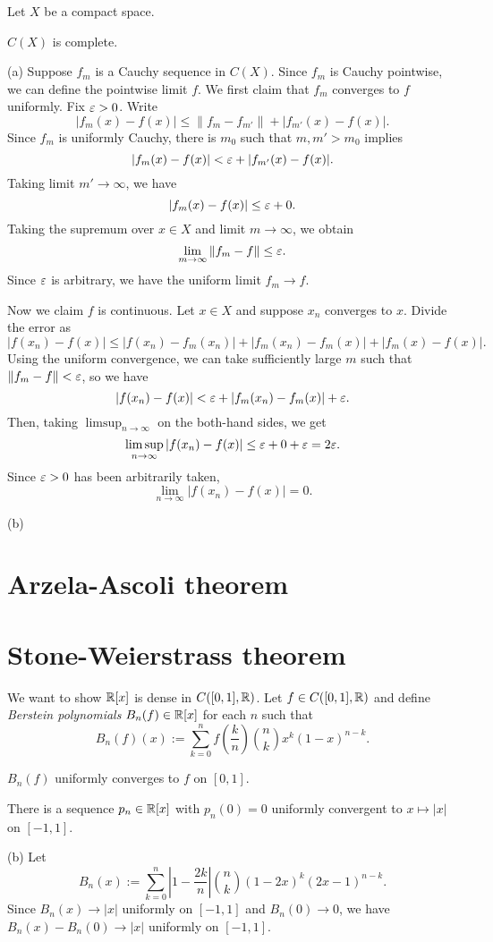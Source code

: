 \documentclass{../../large}
\begin{document}
\begin{prb}
Let $X$ be a compact space.
\begin{parts}
\item $C(X)$ is complete.
\end{parts}
\end{prb}
\begin{pf}
(a)
Suppose $f_m$ is a Cauchy sequence in $C(X)$.
Since $f_m$ is Cauchy pointwise, we can define the pointwise limit $f$.
We first claim that $f_m$ converges to $f$ uniformly.
Fix $\varepsilon>0$.
Write
\[|f_m(x)-f(x)|\le\|f_m-f_{m'}\|+|f_{m'}(x)-f(x)|.\]
Since $f_m$ is uniformly Cauchy, there is $m_0$ such that $m,m'>m_0$ implies
\[|f_m(x)-f(x)|<\varepsilon+|f_{m'}(x)-f(x)|.\]
Taking limit $m'\to\infty$, we have
\[|f_m(x)-f(x)|\le\varepsilon+0.\]
Taking the supremum over $x\in X$ and limit $m\to\infty$, we obtain
\[\lim_{m\to\infty}\|f_m-f\|\le\varepsilon.\]
Since $\varepsilon$ is arbitrary, we have the uniform limit $f_m\to f$.

Now we claim $f$ is continuous.
Let $x\in X$ and suppose $x_n$ converges to $x$.
Divide the error as
\[|f(x_n)-f(x)|\le|f(x_n)-f_m(x_n)|+|f_m(x_n)-f_m(x)|+|f_m(x)-f(x)|.\]
Using the uniform convergence, we can take sufficiently large $m$ such that $\|f_m-f\|<\varepsilon$, so we have
\[|f(x_n)-f(x)|<\varepsilon+|f_m(x_n)-f_m(x)|+\varepsilon.\]
Then, taking $\limsup_{n\to\infty}$ on the both-hand sides, we get
\[\limsup_{n\to\infty}|f(x_n)-f(x)|\le\varepsilon+0+\varepsilon=2\varepsilon.\]
Since $\varepsilon>0$ has been arbitrarily taken,
\[\lim_{n\to\infty}|f(x_n)-f(x)|=0.\]

(b)

\end{pf}

\section{Arzela-Ascoli theorem}

\section{Stone-Weierstrass theorem}

\begin{prb}
We want to show $\mathbb{R}[x]$ is dense in $C([0,1],\mathbb{R})$.
Let $f\in C([0,1],\mathbb{R})$ and define \emph{Berstein polynomials} $B_n(f)\in\mathbb{R}[x]$ for each $n$ such that
\[B_n(f)(x):=\sum_{k=0}^nf\left(\frac kn\right)\binom nkx^k(1-x)^{n-k}.\]
\begin{parts}
\item $B_n(f)$ uniformly converges to $f$ on $[0,1]$.
\item There is a sequence $p_n\in\mathbb{R}[x]$ with $p_n(0)=0$ uniformly convergent to $x\mapsto|x|$ on $[-1,1]$.
\end{parts}
\end{prb}
\begin{pf}
(b)
Let
\[B_n(x):=\sum_{k=0}^n\left|1-\frac{2k}n\right|\binom nk(1-2x)^k(2x-1)^{n-k}.\]
Since $B_n(x)\to|x|$ uniformly on $[-1,1]$ and $B_n(0)\to0$, we have $B_n(x)-B_n(0)\to|x|$ uniformly on $[-1,1]$.
\end{pf}
\end{document}
